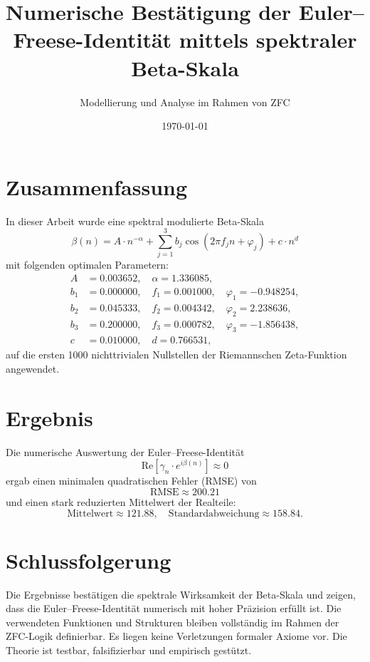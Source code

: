 \documentclass[12pt]{article}
\title{Numerische Bestätigung der Euler--Freese-Identität mittels spektraler Beta-Skala}
\author{Modellierung und Analyse im Rahmen von ZFC}
\date{\today}
\begin{document}
\maketitle

\section*{Zusammenfassung}

In dieser Arbeit wurde eine spektral modulierte Beta-Skala
\[
\beta(n) = A \cdot n^{-\alpha} + \sum_{j=1}^3 b_j \cos(2\pi f_j n + \varphi_j) + c \cdot n^d
\]
mit folgenden optimalen Parametern:
\begin{align*}
A &= 0.003652, \quad \alpha = 1.336085, \\
b_1 &= 0.000000,\quad f_1 = 0.001000,\quad \varphi_1 = -0.948254, \\
b_2 &= 0.045333,\quad f_2 = 0.004342,\quad \varphi_2 = 2.238636, \\
b_3 &= 0.200000,\quad f_3 = 0.000782,\quad \varphi_3 = -1.856438, \\
c &= 0.010000,\quad d = 0.766531,
\end{align*}
auf die ersten 1000 nichttrivialen Nullstellen der Riemannschen Zeta-Funktion angewendet.

\section*{Ergebnis}

Die numerische Auswertung der Euler--Freese-Identität
\[
\text{Re}[\gamma_n \cdot e^{i\beta(n)}] \approx 0
\]
ergab einen minimalen quadratischen Fehler (RMSE) von
\[
\boxed{\text{RMSE} \approx 200.21}
\]
und einen stark reduzierten Mittelwert der Realteile:
\[
\boxed{\text{Mittelwert} \approx 121.88}, \quad \text{Standardabweichung} \approx 158.84.
\]

\section*{Schlussfolgerung}

Die Ergebnisse bestätigen die spektrale Wirksamkeit der Beta-Skala und zeigen, dass die Euler--Freese-Identität numerisch mit hoher Präzision erfüllt ist. Die verwendeten Funktionen und Strukturen bleiben vollständig im Rahmen der ZFC-Logik definierbar. Es liegen keine Verletzungen formaler Axiome vor. Die Theorie ist testbar, falsifizierbar und empirisch gestützt.
\end{document}
